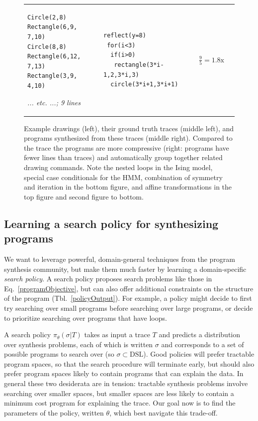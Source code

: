 \documentclass{article}
\begin{document}
\begin{figure}
\begin{tabular}{m{1.5cm}llc}
\begin{minipage}{\exampleTraceSize}\begin{lstlisting}
Circle(2,8)
Rectangle(6,9, 7,10)
Circle(8,8)
Rectangle(6,12, 7,13)
Rectangle(3,9, 4,10)
\end{lstlisting}\small\emph{... etc. ...; 9 lines}
  \end{minipage}&\begin{minipage}{\exampleProgramSize}
\begin{lstlisting}
reflect(y=8)
 for(i<3)
  if(i>0)
   rectangle(3*i-1,2,3*i,3)
  circle(3*i+1,3*i+1)
\end{lstlisting}
\end{minipage}&$\frac{9}{5} = 1.8\text{x}$ %
  \end{tabular}
\caption{Example drawings (left), their ground truth traces (middle left), and programs synthesized from these traces (middle right). Compared to the trace the programs are more compressive (right: programs have fewer lines than traces) and automatically group together related drawing commands. Note the nested loops in the Ising model, special case conditionals for the HMM, combination of symmetry and iteration in the bottom figure, and affine transformations in the top figure and second figure to bottom.}\label{exampleSynthesisResults}
  \vspace{-0.7cm}
  \end{figure}

\subsection{Learning a search policy for synthesizing programs}\label{learningASearchPolicy}

We want to leverage powerful, domain-general techniques from the program synthesis community,
but make them much faster by
learning a domain-specific \emph{search policy}.
A search policy proposes search problems
like those in Eq.~\ref{programObjective},
but can also offer additional constraints on the structure of the program (Tbl.~\ref{policyOutput}).
For example, a policy might decide to first try searching over small programs before searching over large programs,
or decide to prioritize searching over programs that have loops.

A search policy $\pi_\theta(\sigma  | T )$ takes as input a trace $T$ and predicts a distribution over synthesis problems, each of which is written $\sigma $ and corresponds to a set of possible programs to search over (so $\sigma \subset \text{DSL}$).
Good policies will prefer tractable program spaces,
so that the search procedure will terminate early, 
but should also prefer program spaces likely to contain
programs that can explain the data.
In general these two desiderata are in tension:
tractable synthesis problems involve searching over smaller spaces,
but smaller spaces are less likely to contain a minimum cost program
for explaining the trace.
Our goal now is to find the parameters of the policy, written $\theta$, which best navigate this trade-off.
\end{document}
